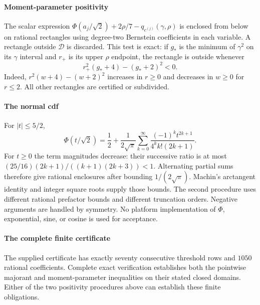 \paragraph{Moment-parameter positivity}
The scalar expression
$\Phi(a_j/\sqrt2)+2\rho/7-q_{c^{(j)}}(\gamma,\rho)$ is enclosed from below
on rational rectangles using degree-two Bernstein coefficients in each
variable. A rectangle outside $\mathcal D$ is discarded. This test is exact:
if $g_*$ is the minimum of $\gamma^2$ on its $\gamma$ interval and $r_+$ is
its upper $\rho$ endpoint, the rectangle is outside whenever
\[
 r_+^2(g_*+4)-(g_*+2)^2<0.
\]
Indeed, $r^2(w+4)-(w+2)^2$ increases in $r\ge0$ and decreases in
$w\ge0$ for $r\le2$. All other rectangles are certified or subdivided.

\paragraph{The normal cdf}
For $|t|\le5/2$,
\begin{equation}\label{ms:finite:n2:eq:normal}
 \Phi(t/\sqrt2)=\frac12+\frac1{2\sqrt\pi}
 \sum_{k=0}^\infty\frac{(-1)^k t^{2k+1}}{4^k k!(2k+1)}.
\end{equation}
For $t\ge0$ the term magnitudes decrease: their successive ratio is at most
$(25/16)(2k+1)/((k+1)(2k+3))<1$. Alternating partial sums therefore give
rational enclosures after bounding $1/(2\sqrt\pi)$. Machin's arctangent
identity and integer square roots supply those bounds. The second procedure
uses different rational prefactor bounds and different truncation orders.
Negative arguments are handled by symmetry. No platform implementation of
$\Phi$, exponential, sine, or cosine is used for acceptance.

\paragraph{The complete finite certificate}
The supplied certificate has exactly seventy consecutive threshold
rows and \(1050\) rational coefficients. Complete exact verification
establishes both the pointwise majorant and moment-parameter inequalities
on their stated closed domains. Either of the two positivity procedures
above can establish these finite obligations.

